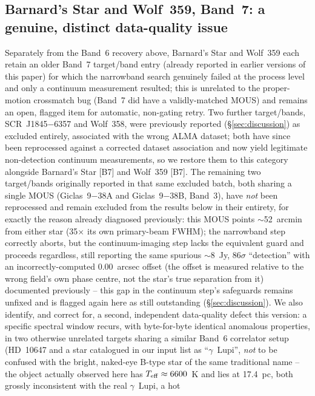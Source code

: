 \documentclass{openjournal}
\begin{document}
\subsection{Barnard's Star and Wolf~359, Band~7: a genuine, distinct
data-quality issue}
\label{sec:barnardswolfband7}

Separately from the Band~6 recovery above, Barnard's Star and Wolf~359
each retain an older Band~7 target/band entry (already reported in
earlier versions of this paper) for which the narrowband search
genuinely failed at the process level and only a continuum measurement
resulted; this is unrelated to the proper-motion crossmatch bug (Band~7
did have a validly-matched MOUS) and remains an open, flagged item for
automatic, non-gating retry. Two further target/bands, SCR~J1845$-$6357
and Wolf~358, were previously reported (\S\ref{sec:discussion}) as
excluded entirely, associated with the wrong ALMA dataset; both have
since been reprocessed against a corrected dataset association and now
yield legitimate non-detection continuum measurements, so we restore
them to this category alongside Barnard's Star [B7] and Wolf~359 [B7].
The remaining two
target/bands originally reported in that same excluded batch, both
sharing a single MOUS (Giclas~9$-$38A and Giclas~9$-$38B, Band~3), have
\emph{not} been reprocessed and remain excluded from the results below
in their entirety, for exactly the reason already diagnosed previously:
this MOUS points $\sim$52~arcmin from either star (35$\times$ its own
primary-beam FWHM); the narrowband step correctly aborts, but the
continuum-imaging step lacks the equivalent guard and proceeds
regardless, still reporting the same spurious $\sim$8~Jy, 86$\sigma$
``detection'' with an incorrectly-computed 0.00~arcsec offset (the
offset is measured relative to the wrong field's own phase centre, not
the star's true separation from it) documented previously -- this gap in
the continuum step's safeguards remains unfixed and is flagged again
here as still outstanding (\S\ref{sec:discussion}). We also
identify, and correct for, a second, independent data-quality defect
this version: a specific spectral window recurs, with byte-for-byte
identical anomalous properties, in two otherwise unrelated targets
sharing a similar Band~6 correlator setup (HD~10647 and a star catalogued
in our input list as ``$\gamma$~Lupi'', \emph{not} to be confused with
the bright, naked-eye B-type star of the same traditional name --
the object actually observed here has $T_{\rm eff}\approx6600$~K and lies
at 17.4~pc, both grossly inconsistent with the real $\gamma$~Lupi, a hot
\end{document}

